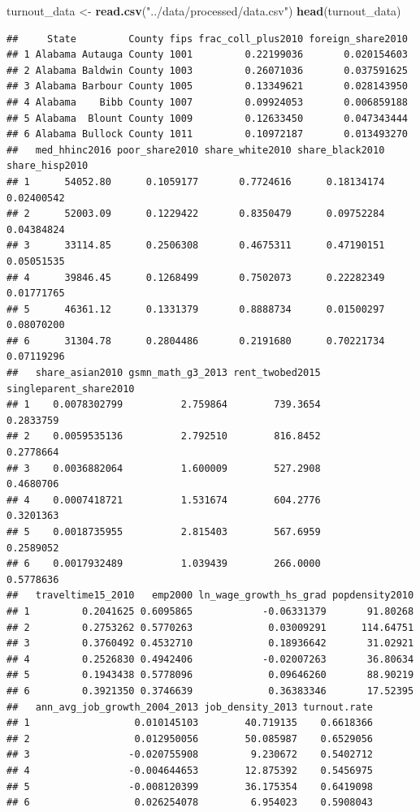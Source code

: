 \documentclass[
]{article}
\newenvironment{Shaded}{\begin{snugshade}}{\end{snugshade}}
\newcommand{\FunctionTok}[1]{\textcolor[rgb]{0.13,0.29,0.53}{\textbf{#1}}}
\newcommand{\NormalTok}[1]{#1}
\newcommand{\OtherTok}[1]{\textcolor[rgb]{0.56,0.35,0.01}{#1}}
\newcommand{\StringTok}[1]{\textcolor[rgb]{0.31,0.60,0.02}{#1}}
\begin{document}
\begin{Shaded}
\begin{Highlighting}[]
\NormalTok{turnout\_data }\OtherTok{\textless{}{-}} \FunctionTok{read.csv}\NormalTok{(}\StringTok{"../data/processed/data.csv"}\NormalTok{)}
\FunctionTok{head}\NormalTok{(turnout\_data)}
\end{Highlighting}
\end{Shaded}

\begin{verbatim}
##     State         County fips frac_coll_plus2010 foreign_share2010
## 1 Alabama Autauga County 1001         0.22199036       0.020154603
## 2 Alabama Baldwin County 1003         0.26071036       0.037591625
## 3 Alabama Barbour County 1005         0.13349621       0.028143950
## 4 Alabama    Bibb County 1007         0.09924053       0.006859188
## 5 Alabama  Blount County 1009         0.12633450       0.047343444
## 6 Alabama Bullock County 1011         0.10972187       0.013493270
##   med_hhinc2016 poor_share2010 share_white2010 share_black2010 share_hisp2010
## 1      54052.80      0.1059177       0.7724616      0.18134174     0.02400542
## 2      52003.09      0.1229422       0.8350479      0.09752284     0.04384824
## 3      33114.85      0.2506308       0.4675311      0.47190151     0.05051535
## 4      39846.45      0.1268499       0.7502073      0.22282349     0.01771765
## 5      46361.12      0.1331379       0.8888734      0.01500297     0.08070200
## 6      31304.78      0.2804486       0.2191680      0.70221734     0.07119296
##   share_asian2010 gsmn_math_g3_2013 rent_twobed2015 singleparent_share2010
## 1    0.0078302799          2.759864        739.3654              0.2833759
## 2    0.0059535136          2.792510        816.8452              0.2778664
## 3    0.0036882064          1.600009        527.2908              0.4680706
## 4    0.0007418721          1.531674        604.2776              0.3201363
## 5    0.0018735955          2.815403        567.6959              0.2589052
## 6    0.0017932489          1.039439        266.0000              0.5778636
##   traveltime15_2010   emp2000 ln_wage_growth_hs_grad popdensity2010
## 1         0.2041625 0.6095865            -0.06331379       91.80268
## 2         0.2753262 0.5770263             0.03009291      114.64751
## 3         0.3760492 0.4532710             0.18936642       31.02921
## 4         0.2526830 0.4942406            -0.02007263       36.80634
## 5         0.1943438 0.5778096             0.09646260       88.90219
## 6         0.3921350 0.3746639             0.36383346       17.52395
##   ann_avg_job_growth_2004_2013 job_density_2013 turnout.rate
## 1                  0.010145103        40.719135    0.6618366
## 2                  0.012950056        50.085987    0.6529056
## 3                 -0.020755908         9.230672    0.5402712
## 4                 -0.004644653        12.875392    0.5456975
## 5                 -0.008120399        36.175354    0.6419098
## 6                  0.026254078         6.954023    0.5908043
\end{verbatim}
\end{document}
